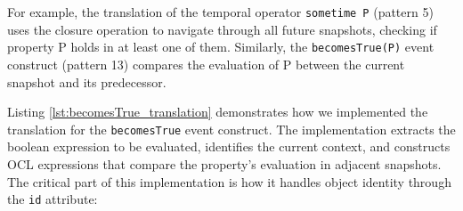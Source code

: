 For example, the translation of the temporal operator \texttt{sometime P} (pattern 5) uses the closure operation to navigate through all future snapshots, checking if property P holds in at least one of them. Similarly, the \texttt{becomesTrue(P)} event construct (pattern 13) compares the evaluation of P between the current snapshot and its predecessor.

Listing \ref{lst:becomesTrue_translation} demonstrates how we implemented the translation for the \texttt{becomesTrue} event construct. The implementation extracts the boolean expression to be evaluated, identifies the current context, and constructs OCL expressions that compare the property's evaluation in adjacent snapshots. The critical part of this implementation is how it handles object identity through the \texttt{id} attribute:


